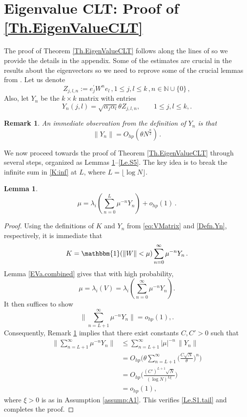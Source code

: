 \documentclass[11pt, reqno]{amsart}
\DeclareMathOperator{\one}{\mathbbm{1}} %
\numberwithin{equation}{section}
\newtheorem{lemma}{Lemma}[section]
\newtheorem{remark}{Remark}[section]
\begin{document}




\appendix 
\section{Eigenvalue CLT: Proof of \ref{Th.EigenValueCLT}} \label{appendixA}

The proof of Theorem \ref{Th.EigenValueCLT} follows along the lines of \cite{chakrabarty2020eigenvalues} so we provide the details in the appendix. Some of the estimates are crucial in the results about the eigenvectors so we need to reprove some of the crucial lemmas from \cite{chakrabarty2020eigenvalues}.
Let us denote
\[
Z_{j,l,n}:=e_j^\prime W^n e_l\,,1\le j,l\le k\,,n\in \mathbb N \cup \{0\}\,,
\]
Also, let $Y_n$ be the $k\times k$ matrix with entries
\begin{equation}\label{Defn.Yn}
Y_n(j,l) = \sqrt{\alpha_j\alpha_l}\theta Z_{j,l,n}, \qquad 1\le j,l\le k,.
\end{equation}
\begin{remark}\label{EVa.YN.normbound}
An immediate observation from the definition of $Y_n$ is that
\[
    \|Y_n\| = O_{hp}(\theta N^{\frac{n}{2}})\,.
\]
\end{remark}

We now proceed towards the proof of Theorem \ref{Th.EigenValueCLT} through several steps, organized as Lemmas \ref{Le.S1}–\ref{Le.S5}. The key idea is to break the infinite sum in \eqref{K:inf} at $L$, where $L=\lfloor\log N\rfloor$.

\begin{lemma}\label{Le.S1}
\[
\mu=\lambda_i\left(\sum_{n=0}^L\mu^{-n}Y_n\right)+o_{hp}(1)\,.
\]  
\end{lemma}

\begin{proof}
Using the definitions of $K$ and $Y_n$ from \eqref{eq:VMatrix} and \eqref{Defn.Yn}, respectively, it is immediate that
\[
K=\one(\|W\|<\mu)\sum_{n=0}^\infty\mu^{-n}Y_n\,.
\]
Lemma \ref{EVa.combined} gives that with high probability,
\[\mu = \lambda_i(V) = \lambda_i(\sum_{n=0}^\infty\mu^{-n}Y_n).\]
It then suffices to show
\begin{equation}\label{Le.S1.tail}
\Big\|\sum_{n=L+1}^\infty \mu^{-n}Y_n\Big\| = o_{hp}(1),.
\end{equation}
Consequently, Remark \ref{EVa.YN.normbound} implies that there exist constants $C, C'>0$ such that
\begin{align*}
\Big\|\sum_{n=L+1}^\infty \mu^{-n}Y_n\Big\| &\le \sum_{n=L+1}^\infty |\mu|^{-n}\,\|Y_n\| \\
&= O_{hp}\Big(\theta \sum_{n=L+1}^{\infty}\Big(\frac{C\sqrt{N}}{\theta}\Big)^n\Big) \\
&= O_{hp}\Big(\frac{(C')^{L+1}\sqrt{N}}{(\log N)^{L\xi}}\Big) \\
&= o_{hp}(1),
\end{align*}
where $\xi>0$ is as in Assumption \ref{assump:A1}. This verifies \eqref{Le.S1.tail} and completes the proof.
\end{proof}
\end{document}
